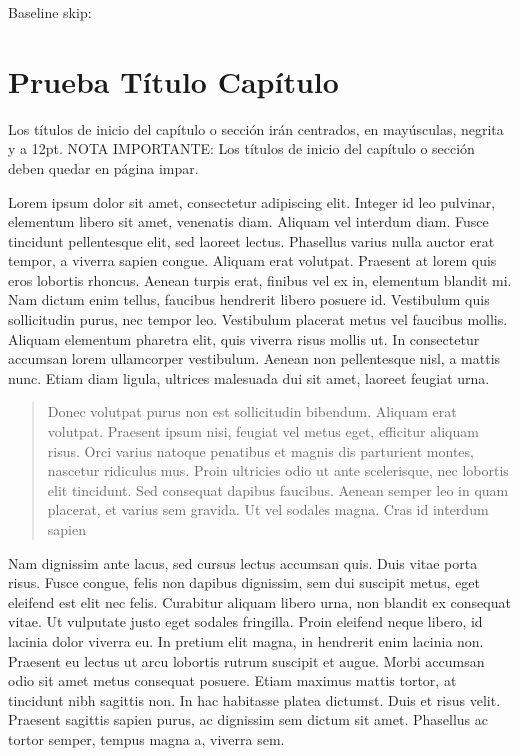 
\currentpage
\pagediagram
\pagevalues

\currentpage
\pagedesign

Baseline skip:
\the\baselineskip

\chapter{Prueba Título Capítulo}
Los títulos de inicio del capítulo o sección irán centrados, en mayúsculas, negrita y a 12pt. NOTA IMPORTANTE: Los títulos de inicio del capítulo o sección deben quedar en página impar.

Lorem ipsum dolor sit amet, consectetur adipiscing elit. Integer id leo pulvinar, elementum libero sit amet, venenatis diam. Aliquam vel interdum diam. Fusce tincidunt pellentesque elit, sed laoreet lectus. Phasellus varius nulla auctor erat tempor, a viverra sapien congue. Aliquam erat volutpat. Praesent at lorem quis eros lobortis rhoncus. Aenean turpis erat, finibus vel ex in, elementum blandit mi. Nam dictum enim tellus, faucibus hendrerit libero posuere id\autocite[Cf.][12]{teichmann2008ans}.
Vestibulum quis sollicitudin purus, nec tempor leo. Vestibulum placerat metus vel faucibus mollis. Aliquam elementum pharetra elit, quis viverra risus mollis ut. In consectetur accumsan lorem ullamcorper vestibulum. Aenean non pellentesque nisl, a mattis nunc. Etiam diam ligula, ultrices malesuada dui sit amet, laoreet feugiat urna. \blockquote[]{Donec volutpat purus non est sollicitudin bibendum. Aliquam erat volutpat. Praesent ipsum nisi, feugiat vel metus eget, efficitur aliquam risus. Orci varius natoque penatibus et magnis dis parturient montes, nascetur ridiculus mus. Proin ultricies odio ut ante scelerisque, nec lobortis elit tincidunt. Sed consequat dapibus faucibus. Aenean semper leo in quam placerat, et varius sem gravida. Ut vel sodales magna. Cras id interdum sapien}.

Nam dignissim ante lacus, sed cursus lectus accumsan quis. Duis vitae porta risus. Fusce congue, felis non dapibus dignissim, sem dui suscipit metus, eget eleifend est elit nec felis. Curabitur aliquam libero urna, non blandit ex consequat vitae. Ut vulputate justo eget sodales fringilla. Proin eleifend neque libero, id lacinia dolor viverra eu. In pretium elit magna, in hendrerit enim lacinia non. Praesent eu lectus ut arcu lobortis rutrum suscipit et augue. Morbi accumsan odio sit amet metus consequat posuere. Etiam maximus mattis tortor, at tincidunt nibh sagittis non. In hac habitasse platea dictumst. Duis et risus velit. Praesent sagittis sapien purus, ac dignissim sem dictum sit amet. Phasellus ac tortor semper, tempus magna a, viverra sem.


